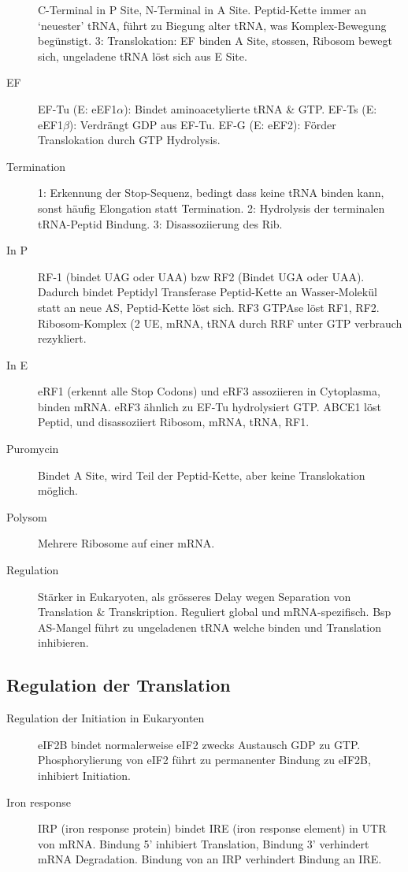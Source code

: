 \documentclass[a4paper,twocolumn,usegeometry,english,fontsize=5,DIV=28]{scrartcl}
\begin{document}
\begin{description}
		C-Terminal in P Site, N-Terminal in A Site. Peptid-Kette immer
		an `neuester' tRNA, führt zu Biegung alter tRNA, was
		Komplex-Bewegung begünstigt. 3: Translokation: EF binden A
		Site, stossen, Ribosom bewegt sich, ungeladene tRNA löst sich
		aus E Site.
	\item[EF] EF-Tu (E: eEF1$\alpha$): Bindet aminoacetylierte tRNA \& GTP.
		EF-Ts (E: eEF1$\beta$): Verdrängt GDP aus EF-Tu. EF-G (E:
		eEF2): Förder Translokation durch GTP Hydrolysis.
	\item[Termination] 1: Erkennung der Stop-Sequenz, bedingt dass keine
		tRNA binden kann, sonst häufig Elongation statt Termination. 2:
		Hydrolysis der terminalen tRNA-Peptid Bindung. 3:
		Disassoziierung des Rib.
	\item[In P] RF-1 (bindet UAG oder UAA) bzw RF2 (Bindet UGA oder UAA).
		Dadurch bindet Peptidyl Transferase Peptid-Kette an
		Wasser-Molekül statt an neue AS, Peptid-Kette löst sich. RF3
		GTPAse löst RF1, RF2. Ribosom-Komplex (2 UE, mRNA, tRNA durch
		RRF unter GTP verbrauch rezykliert.
	\item[In E] eRF1 (erkennt alle Stop Codons) und eRF3 assoziieren in
		Cytoplasma, binden mRNA. eRF3 ähnlich zu EF-Tu hydrolysiert
		GTP. ABCE1 löst Peptid, und disassoziiert Ribosom, mRNA, tRNA,
		RF1.
	\item[Puromycin] Bindet A Site, wird Teil der Peptid-Kette, aber keine
		Translokation möglich.
	\item[Polysom] Mehrere Ribosome auf einer mRNA.
	\item[Regulation] Stärker in Eukaryoten, als grösseres Delay wegen
		Separation von Translation \& Transkription. Reguliert global
		und mRNA-spezifisch. Bsp AS-Mangel führt zu ungeladenen tRNA
		welche binden und Translation inhibieren.
\end{description}

\subsection{Regulation der Translation}

\begin{description}
	\item[Regulation der Initiation in Eukaryonten] eIF2B bindet
		normalerweise eIF2 zwecks Austausch GDP zu GTP.
		Phosphorylierung von eIF2 führt zu permanenter Bindung zu
		eIF2B, inhibiert Initiation.
	\item[Iron response] IRP (iron response protein) bindet IRE (iron
		response element) in UTR von mRNA. Bindung 5' inhibiert
		Translation, Bindung 3' verhindert mRNA Degradation. Bindung
		von  an IRP verhindert Bindung an IRE.
\end{description}
\end{document}
